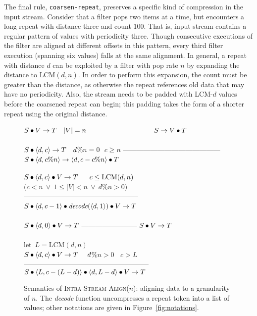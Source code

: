 The final rule, {\tt coarsen-repeat}, preserves a specific kind of
compression in the input stream.  Consider that a filter pops two
items at a time, but encounters a long repeat with distance three and
count 100.  That is, input stream contains a regular pattern of values
with periodicity three.  Though consecutive executions of the filter
are aligned at different offsets in this pattern, every third filter
execution (spanning six values) falls at the same alignment.  In
general, a repeat with distance $d$ can be exploited by a filter with
pop rate $n$ by expanding the distance to $\mbox{LCM}(d, n)$.  In
order to perform this expansion, the count must be greater than the
distance, as otherwise the repeat references old data that may have no
periodicity.  Also, the stream needs to be padded with LCM-$d$ values
before the coarsened repeat can begin; this padding takes the form of
a shorter repeat using the original distance.  

\begin{figure}[t]
$S \bullet V \rightarrow T~~~|V|=n$\skiptopb
---------------------------\skipbot
$S \rightarrow V \bullet T$
~ \\ ~ \\
$S \bullet \langle d, c\rangle \rightarrow T~~~d$\%$n=0~~~c \ge n$\skiptopb
------------------------------------------\skipbot
$S \concat \tup{d}{c$\%$n} \rightarrow \tup{d}{c-c$\%$n} \concat T$
~ \\ ~ \\
$S \bullet \langle d, c\rangle \bullet V \rightarrow T~~~~~c\le\mbox{LCM}(d,n)$\\
$(c<n~\vee~1 \le |V|<n~\vee~d$\%$n>0)$\skiptopb
--------------------------------------------------\skipbot
$S \bullet \langle d, c-1\rangle \bullet \mbox{\it decode}(\langle d, 1\rangle) \bullet V \rightarrow T$
~ \\ ~ \\
$S \bullet \langle d, 0\rangle \bullet V \rightarrow T$\skiptopb
------------------------\skipbot
$S \bullet V \rightarrow T$
~ \\ ~ \\
let~$L=\mbox{LCM}(d,n)$\\
$S \bullet \langle d, c\rangle \bullet V \rightarrow T~~~~d$\%$n > 0~~~~c > L$\vspace{-3pt}\skiptopa
------------------------------------------------------\skipbot
$S \bullet \langle L, c-(L-d)\rangle \bullet \langle d, L-d\rangle \bullet V \rightarrow T$
\caption{Semantics of \textsc{Intra-Stream-Align}($n$): aligning data
to a granularity of $n$.  The \mbox{\it decode} function uncompresses
a repeat token into a list of values; other notations are given in
Figure~\ref{fig:notations}. \protect\label{fig:intra-stream-align}}
\end{figure}

